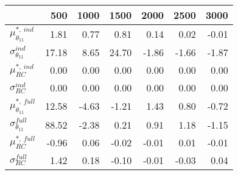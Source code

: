 \begin{tabular}{lrrrrrr}
\toprule
{} &   500  &  1000 &   1500 &  2000 &  2500 &  3000 \\
\midrule
$\mu_{\theta_{11}}^{\ast,\ ind}$  &   1.81 &  0.77 &   0.81 &  0.14 &  0.02 & -0.01 \\
$\sigma_{\theta_{11}}^{ind}$      &  17.18 &  8.65 &  24.70 & -1.86 & -1.66 & -1.87 \\
$\mu_{RC}^{\ast,\ ind}$           &   0.00 &  0.00 &   0.00 &  0.00 &  0.00 &  0.00 \\
$\sigma_{RC}^{ind}$               &   0.00 &  0.00 &   0.00 &  0.00 &  0.00 &  0.00 \\
$\mu_{\theta_{11}}^{\ast,\ full}$ &  12.58 & -4.63 &  -1.21 &  1.43 &  0.80 & -0.72 \\
$\sigma_{\theta_{11}}^{full}$     &  88.52 & -2.38 &   0.21 &  0.91 &  1.18 & -1.15 \\
$\mu_{RC}^{\ast,\ full}$          &  -0.96 &  0.06 &  -0.02 & -0.01 &  0.01 & -0.01 \\
$\sigma_{RC}^{full}$              &   1.42 &  0.18 &  -0.10 & -0.01 & -0.03 &  0.04 \\
\bottomrule
\end{tabular}
